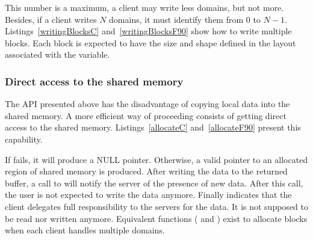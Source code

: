 \noindent\begin{minipage}{\textwidth}
\vspace{0.5cm}

\end{minipage}

This number is a maximum, a client may write less domains, but not more. Besides, if a client
writes $N$ domains, it must identify them from $0$ to $N-1$.
Listings~\ref{writingBlocksC} and~\ref{writingBlocksF90} show how to write multiple blocks.
Each block is expected to have the size and shape defined in the layout associated with the variable.

\noindent\begin{minipage}{\textwidth}
\vspace{0.5cm}

\end{minipage}

\noindent\begin{minipage}{\textwidth}

\end{minipage}

\subsubsection{Direct access to the shared memory}

The API presented above has the disadvantage of copying local data into the shared memory.
A more efficient way of proceeding consists of getting direct access to the shared memory.
Listings~\ref{allocateC} and~\ref{allocateF90} present this capability.

If  fails, it will produce a NULL pointer. Otherwise, a valid pointer
to an allocated region of shared memory is produced.
After writing the data to the returned buffer, a call to  will notify the server
of the presence of new data. After this call, the user is not expected to write the data anymore.
Finally  indicates that the client delegates full responsibility to the
servers for the data. It is not supposed to be read nor written anymore.
Equivalent functions ( and ) 
exist to allocate blocks when each client handles multiple domains.

